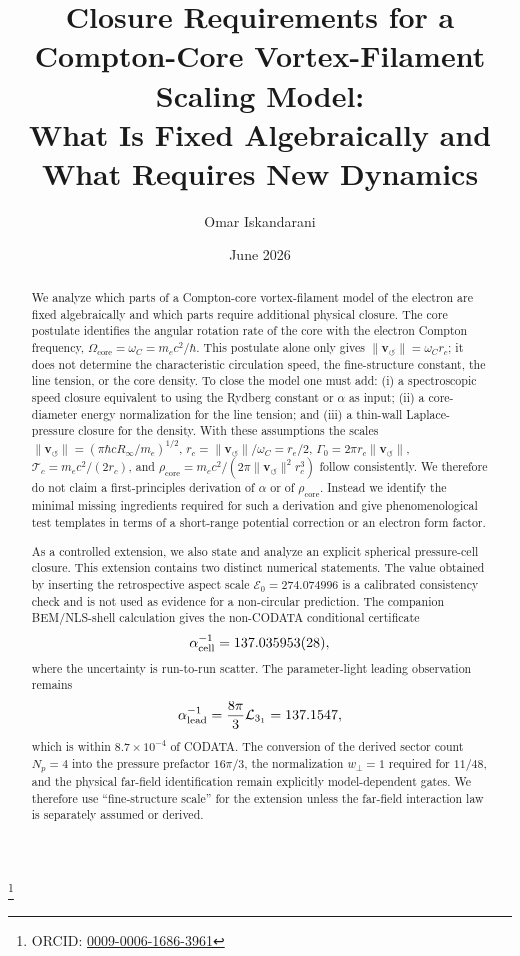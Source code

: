 \documentclass[aps,pra,preprint,longbibliography,nofootinbib]{revtex4-2}
\newcommand{\Et}{\mathcal{E}_0}                    %
\begin{document}
\title{Closure Requirements for a Compton-Core Vortex-Filament Scaling Model:\\
       What Is Fixed Algebraically and What Requires New Dynamics}

\author{Omar Iskandarani}
\thanks{ORCID: \href{https://orcid.org/0009-0006-1686-3961}{0009-0006-1686-3961}}
\date{June 2026}


\begin{abstract}
We analyze which parts of a Compton-core vortex-filament model of the
electron are fixed algebraically and which parts require additional
physical closure.  The core postulate identifies the angular rotation
rate of the core with the electron Compton frequency,
$\Omega_{\mathrm{core}}=\omega_C=m_e c^2/\hbar$.  This postulate alone
only gives $\lVert \mathbf{v}_{\!\boldsymbol{\circlearrowleft}}\rVert=\omega_C r_c$;
it does not determine the characteristic circulation speed, the
fine-structure constant, the line tension, or the core density.  To close
the model one must add: (i) a spectroscopic speed closure equivalent to
using the Rydberg constant or $\alpha$ as input; (ii) a core-diameter
energy normalization for the line tension; and (iii) a thin-wall
Laplace-pressure closure for the density.  With these assumptions the
scales
$\lVert \mathbf{v}_{\!\boldsymbol{\circlearrowleft}}\rVert=(\pi\hbar cR_\infty/m_e)^{1/2}$,
$r_c=\lVert \mathbf{v}_{\!\boldsymbol{\circlearrowleft}}\rVert/\omega_C=r_e/2$,
$\Gamma_0=2\pi r_c\lVert \mathbf{v}_{\!\boldsymbol{\circlearrowleft}}\rVert$,
$\mathcal{T}_c=m_ec^2/(2r_c)$, and
$\rho_{\mathrm{core}}=m_ec^2/(2\pi\lVert \mathbf{v}_{\!\boldsymbol{\circlearrowleft}}\rVert^2r_c^3)$
follow consistently.  We therefore do not claim a first-principles
derivation of $\alpha$ or of $\rho_{\mathrm{core}}$.  Instead we identify
the minimal missing ingredients required for such a derivation and give
phenomenological test templates in terms of a short-range potential
correction or an electron form factor.

As a controlled extension, we also state and analyze an explicit spherical
pressure-cell closure.  This extension contains two distinct numerical
statements.  The value obtained by inserting the retrospective aspect scale
$\Et=274.074996$ is a calibrated consistency check and is not used as evidence
for a non-circular prediction.  The companion BEM/NLS-shell calculation gives
the non-CODATA conditional certificate
\[
  \alpha_{\rm cell}^{-1}=137.035953(28),
\]
where the uncertainty is run-to-run scatter.  The parameter-light leading
observation remains
\[
  \alpha_{\rm lead}^{-1}
  =
  \frac{8\pi}{3}\mathcal L_{3_1}
  =
  137.1547,
\]
which is within \(8.7\times10^{-4}\) of CODATA.  The conversion of the derived
sector count \(N_p=4\) into the pressure prefactor \(16\pi/3\), the
normalization \(w_\perp=1\) required for \(11/48\), and the physical far-field
identification remain explicitly model-dependent gates.  We therefore use
``fine-structure scale'' for the extension unless the far-field interaction law
is separately assumed or derived.


\end{abstract}
\end{document}
